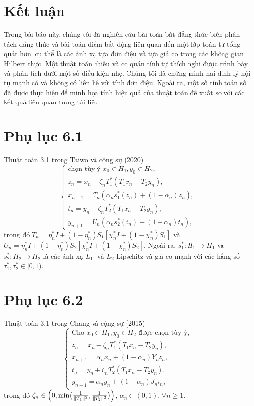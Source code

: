 \documentclass{MyBook}
\theoremstyle{plain}
\theoremstyle{definition}
\theoremstyle{remark}
\numberwithin{equation}{chapter}
\newcommand{\nm}[1]{\lVert #1\rVert}
\begin{document}
\chapter{Kết luận}\label{sec:concl}

Trong bài báo này, chúng tôi đã nghiên cứu bài toán bất đẳng thức biến phân tách đẳng thức và bài toán điểm bất động liên quan đến một lớp toán tử tổng quát hơn, cụ thể là các ánh xạ tựa đơn điệu và tựa giả co trong các không gian Hilbert thực. Một thuật toán chiếu và co quán tính tự thích nghi được trình bày và phân tích dưới một số điều kiện nhẹ. Chúng tôi đã chứng minh hai định lý hội tụ mạnh có và không có liên hệ với tính đơn điệu. Ngoài ra, một số tính toán số đã được thực hiện để minh họa tính hiệu quả của thuật toán đề xuất so với các kết quả liên quan trong tài liệu.

\chapter*{Phụ lục 6.1}

Thuật toán 3.1 trong Taiwo và cộng sự (2020)
\[
\begin{cases}
\text{chọn tùy ý } x_0\in H_1, y_0\in H_2,\\
z_n=x_n-\zeta_n T_1^{*}(T_1x_n-T_2y_n),\\
x_{n+1}=T_n(\alpha_n s_1^{*}(z_n)+(1-\alpha_n)z_n),\\
t_n=y_n+\zeta_n T_2^{*}(T_1x_n-T_2y_n),\\
y_{n+1}=U_n(\alpha_n s_2^{*}(t_n)+(1-\alpha_n)t_n),
\end{cases}
\]
trong đó $T_n=\eta_n^{*}I+(1-\eta_n^{*})S_1[\chi_n^{*}I+(1-\chi_n^{*})S_1]$ và $U_n=\eta_n^{*}I+(1-\eta_n^{*})S_2[\chi_n^{*}I+(1-\chi_n^{*})S_2]$. Ngoài ra, $s_1^{*}:H_1\to H_1$ và $s_2^{*}:H_2\to H_2$ là các ánh xạ $L_1$- và $L_2$-Lipschitz và giả co mạnh với các hằng số $\tau_1^{*},\tau_2^{*}\in[0,1)$.

\chapter*{Phụ lục 6.2}

Thuật toán 3.1 trong Chang và cộng sự (2015)
\[
\begin{cases}
\text{Cho } x_0\in H_1, y_0\in H_2 \text{ được chọn tùy ý},\\
z_n=x_n-\zeta_n T_1^{*}(T_1x_n-T_2y_n),\\
x_{n+1}=\alpha_n x_n+(1-\alpha_n)Y_n z_n,\\
t_n=y_n+\zeta_n T_2^{*}(T_1x_n-T_2y_n),\\
y_{n+1}=\alpha_n y_n+(1-\alpha_n)J_n t_n,
\end{cases}
\]
trong đó $\zeta_n\in\Bigl(0,\min\bigl(\tfrac{1}{\nm{T_1}^2},\tfrac{1}{\nm{T_2}^2}\bigr)\Bigr)$, $\alpha_n\in(0,1)$, $\forall n\ge 1$.
\end{document}
